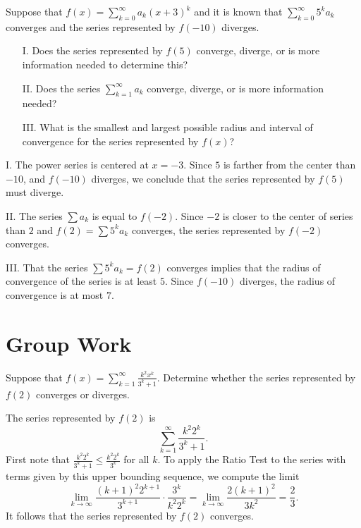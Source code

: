 \documentclass[]{ximera}
\begin{document}
\begin{problem} 
Suppose that $f(x) = \sum_{k=0}^{\infty} a_k (x+3)^k$ and it is known that $\sum_{k=0}^{\infty} 5^k a_k$ converges and the series represented by $f(-10)$ diverges.

\begin{itemize}
\item[I.] Does the series represented by $f(5)$ converge, diverge, or is more information needed to determine this?
\item[II.] Does the series $\sum_{k=1}^{\infty} a_k$ converge, diverge, or is more information needed?
\item[III.] What is the smallest and largest possible radius and interval of convergence for the series represented by $f(x)$?
\end{itemize}


\begin{solution}
I. The power series is centered at $x=-3$.  Since $5$ is farther from the center than $-10$, and $f(-10)$ diverges, we conclude that the series represented by $f(5)$ must diverge.

II. The series $\sum a_k$ is equal to $f(-2)$. Since $-2$ is closer to the center of series than $2$ and  $f(2) = \sum 5^k a_k$ converges, the series represented by $f(-2)$ converges.

III. That the series $\sum 5^k a_k = f(2)$ converges implies that the radius of convergence of the series is at least $5$. Since $f(-10)$ diverges, the radius of convergence is at most $7$.
\end{solution}
\end{problem}


\section{Group Work}


\begin{problem} 
Suppose that $f(x) = \sum_{k=1}^{\infty} \frac{k^2x^k}{3^k+1}$.  Determine whether the series represented by $f(2)$ converges or diverges.


\begin{solution}
The series represented by $f(2)$ is 
$$
\sum_{k=1}^{\infty} \frac{k^2 2^k}{3^k+1}.
$$
First note that $\frac{k^2 2^k}{3^k+1} \leq \frac{k^2 2^k}{3^k}$ for all $k$. To apply the Ratio Test to the series with terms given by this upper bounding sequence, we compute the limit
$$
\lim_{k\rightarrow \infty} \frac{(k+1)^2 2^{k+1}}{3^{k+1}} \cdot \frac{3^k}{k^2 2^k} = \lim_{k\rightarrow \infty} \frac{2(k+1)^2}{3k^2} = \frac{2}{3}.
$$
It follows that the series represented by $f(2)$ converges.
\end{solution}
\end{problem}
\end{document}
